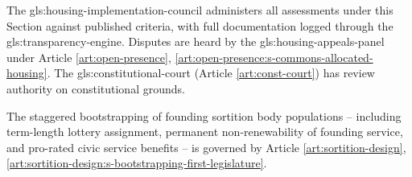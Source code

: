 The \gls{gls:housing-implementation-council} administers all assessments under this Section against published criteria, with full documentation logged through the \gls{gls:transparency-engine}. Disputes are heard by the \gls{gls:housing-appeals-panel} under Article \ref{art:open-presence}, \ref{art:open-presence:s-commons-allocated-housing}. The \gls{gls:constitutional-court} (Article \ref{art:const-court}) has review authority on constitutional grounds.

The staggered bootstrapping of founding sortition body populations -- including term-length lottery assignment, permanent non-renewability of founding service, and pro-rated civic service benefits -- is governed by Article \ref{art:sortition-design}, \ref{art:sortition-design:s-bootstrapping-first-legislature}.